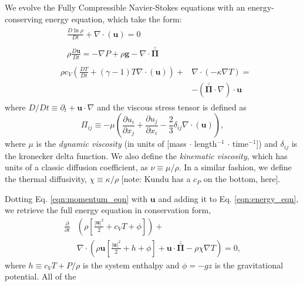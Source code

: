 \documentclass[aps, prl, twocolumn, groupedaddress]{revtex4-1}
\newcommand{\Div}[1]{\ensuremath{\nabla\cdot\left( #1\right)}}
\newcommand{\grad}{\ensuremath{\nabla}}
\newcommand{\stressT}{\ensuremath{\bm{\bar{\bar{\Pi}}}}}
\begin{document}
We evolve the Fully Compressible Navier-Stokes equations with an energy-conserving energy equation,
which take the form:
\begin{align}
&\begin{aligned}
&\frac{D \ln\rho}{D t} + \Div{\bm{u}} = 0
	\label{eqn:continuity_eqn}
\end{aligned}\\
&\begin{aligned}
&\rho\frac{D\bm{u}}{D t}=
-\grad P + \rho\bm{g} - \nabla\cdot\stressT
	\label{eqn:momentum_eqn}
\end{aligned}\\
&\begin{aligned}
\rho c_V\left(\frac{D T}{D t} + (\gamma-1)T\Div{\bm{u}}\right) + &\Div{-\kappa\grad T} = \\
&-\left(\stressT\cdot\nabla\right)\cdot\bm{u} 
	\label{eqn:energy_eqn}
\end{aligned}
\end{align}
where $D/Dt \equiv \partial_t + \bm{u}\cdot\grad$ and the viscous stress tensor is defined as
\begin{equation}
\Pi_{ij} \equiv -\mu\left(\frac{\partial u_i}{\partial x_j} + \frac{\partial u_j}{\partial x_i} - \frac{2}{3}\delta_{ij}\Div{\bm{u}}\right),
	\label{eqn:stress_tensor}
\end{equation}
where $\mu$ is the \emph{dynamic viscosity} (in units of [mass $\cdot$ length$^{-1}$ $\cdot$ time$^{-1}$]) and $\delta_{ij}$
is the kronecker delta function.  We also define the \emph{kinematic viscosity}, which has units of a classic diffusion coefficient,
as $\nu \equiv \mu/\rho$.  In a similar fashion, we define the thermal diffusivity, $\chi \equiv \kappa / \rho$ [note: Kundu has a $c_P$ on
the bottom, here].

Dotting Eq. \ref{eqn:momentum_eqn} with $\bm{u}$ and adding it to Eq. \ref{eqn:energy_eqn}, we retrieve the full energy equation in
conservation form,
\begin{equation}
\begin{split}
\frac{\partial}{\partial t}&\left(\rho\left[\frac{|\bm{u}|^2}{2} + c_V T + \phi\right]\right) +\\
&\Div{\rho\bm{u}\left[\frac{|\bm{u}|^2}{2} + h + \phi\right] + \bm{u}\cdot\stressT - \rho\chi\grad T} = 0,
	\label{eqn:energy_eqn_full}
\end{split}
\end{equation}
where $h \equiv c_V T + P/\rho$ is the system enthalpy and $\phi = -gz$ is the gravitational potential.  All of the 
\end{document}
